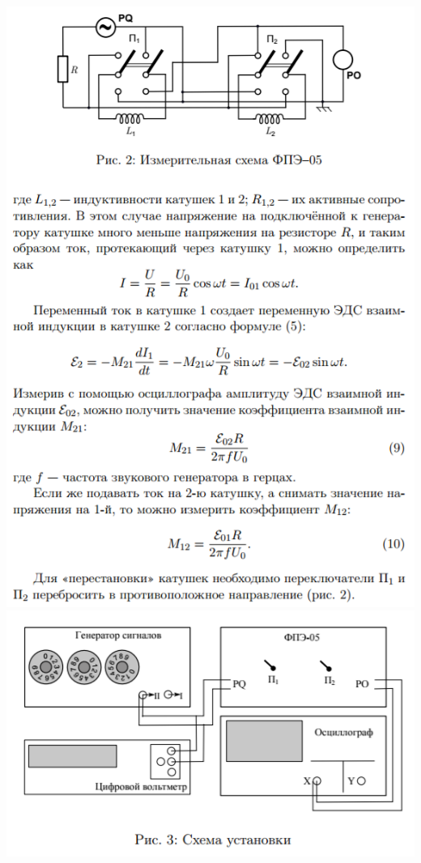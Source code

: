 \documentclass[12pt]{article}
\begin{document}
\begin{center}
    	\includegraphics[width=15cm]{theory4.png}
    	\includegraphics[width=15cm]{theory5.png}
    \end{center}
    
\end{document}

